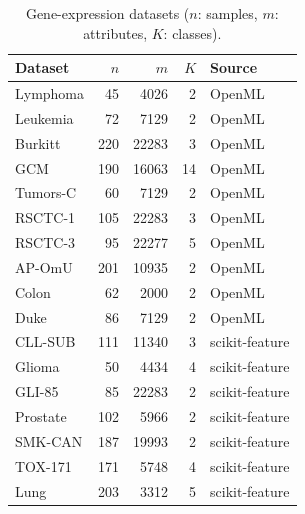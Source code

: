 \begin{table}[!t]
\centering
\caption{Gene-expression datasets ($n$: samples, $m$: attributes, $K$: classes).}
\label{tab:data}
\scriptsize
\begin{tabular*}{\columnwidth}{@{\extracolsep{\fill}}lrrrl@{}}
\toprule
Dataset & $n$ & $m$ & $K$ & Source \\
\midrule
Lymphoma & 45 & 4026 & 2 & OpenML \\
Leukemia & 72 & 7129 & 2 & OpenML \\
Burkitt & 220 & 22283 & 3 & OpenML \\
GCM & 190 & 16063 & 14 & OpenML \\
Tumors-C & 60 & 7129 & 2 & OpenML \\
RSCTC-1 & 105 & 22283 & 3 & OpenML \\
RSCTC-3 & 95 & 22277 & 5 & OpenML \\
AP-OmU & 201 & 10935 & 2 & OpenML \\
Colon & 62 & 2000 & 2 & OpenML \\
Duke & 86 & 7129 & 2 & OpenML \\
CLL-SUB & 111 & 11340 & 3 & scikit-feature \\
Glioma & 50 & 4434 & 4 & scikit-feature \\
GLI-85 & 85 & 22283 & 2 & scikit-feature \\
Prostate & 102 & 5966 & 2 & scikit-feature \\
SMK-CAN & 187 & 19993 & 2 & scikit-feature \\
TOX-171 & 171 & 5748 & 4 & scikit-feature \\
Lung & 203 & 3312 & 5 & scikit-feature \\
\bottomrule
\end{tabular*}
\end{table}
